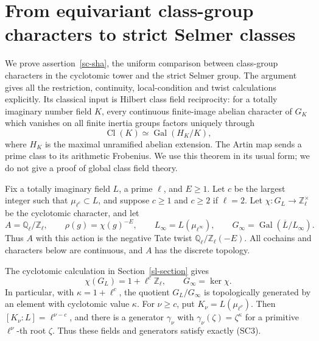 \section{From equivariant class-group characters to strict Selmer classes}
\label{sp-section}

We prove assertion~\ref{sc-sha}, the uniform comparison between
class-group characters in the cyclotomic tower and the strict
Selmer group.  The argument gives all the restriction,
continuity, local-condition and twist calculations explicitly.
Its classical input is Hilbert class field reciprocity:
for a totally imaginary number field $K$, every continuous
finite-image abelian character of $G_K$ which vanishes on all
finite inertia groups factors uniquely through
\[
                  \operatorname{Cl}(K)
                    \simeq\operatorname{Gal}(H_K/K),
                  \tag{SP1}
\]
where $H_K$ is the maximal unramified abelian extension.
The Artin map sends a prime class to its arithmetic Frobenius.
We use this theorem in its usual form; we do not give a proof
of global class field theory\cite[Chapter V, \S3,
Theorems 3.5--3.6 and Example 3.9]{milne-cft}.

Fix a totally imaginary field $L$, a prime $\ell$, and $E\ge1$.
Let $c$ be the largest integer such that
$\mu_{\ell^c}\subset L$, and suppose $c\ge1$ and $c\ge2$
if $\ell=2$.
Let $\chi:G_L\to\mathbb Z_\ell^\times$ be the cyclotomic
character, and let
\[
 A=\mathbb Q_\ell/\mathbb Z_\ell,\qquad
 \rho(g)=\chi(g)^{-E},\qquad
 L_\infty=L(\mu_{\ell^\infty}),\qquad
 G_\infty=\operatorname{Gal}(\overline L/L_\infty).
 \tag{SP2}
\]
Thus $A$ with this action is the negative Tate twist
$\mathbb Q_\ell/\mathbb Z_\ell(-E)$.
All cochains and characters below are continuous, and $A$
has the discrete topology.

The cyclotomic calculation in Section~\ref{sl-section} gives
\[
        \chi(G_L)=1+\ell^c\mathbb Z_\ell,\qquad
        G_\infty=\ker\chi.
        \tag{SP3}
\]
In particular, with $\kappa=1+\ell^c$, the quotient
$G_L/G_\infty$ is topologically generated by an element
with cyclotomic value $\kappa$.
For $\nu\ge c$, put $K_\nu=L(\mu_{\ell^\nu})$.
Then $[K_\nu:L]=\ell^{\nu-c}$, and there is a generator
$\gamma_\nu$ with
$\gamma_\nu(\zeta)=\zeta^\kappa$ for a primitive
$\ell^\nu$-th root $\zeta$.  Thus these fields and generators
satisfy exactly (SC3).

